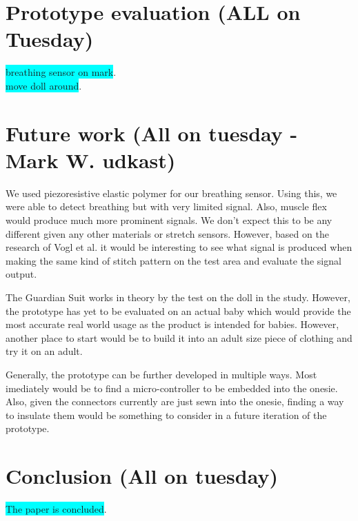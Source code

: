 \documentclass{sigchi-ext}
\begin{document}
\section{Prototype evaluation (ALL on Tuesday)}
\colorbox{cyan}{breathing sensor on mark}.\\
\colorbox{cyan}{move doll around}.

\section{Future work (All on tuesday - Mark W. udkast)}
We used piezoresistive elastic polymer for our breathing sensor. Using this,
we were able to detect breathing but with very limited signal. Also, muscle flex
would produce much more prominent signals. We don't expect this to be any
different given any other materials or stretch sensors. However,
based on the research of Vogl et al. \cite{stretcheband} it would be interesting
to see what signal is produced when making the same kind of stitch pattern on
the test area and evaluate the signal output.

The Guardian Suit works in theory by the test on the doll in the study. However,
the prototype has yet to be evaluated on an actual baby which would provide the
most accurate real world usage as the product is intended for babies. However,
another place to start would be to build it into an adult size piece of clothing
and try it on an adult.

Generally, the prototype can be further developed in multiple ways. Most imediately would be to 
find a micro-controller to be embedded into the onesie. Also, given the connectors currently are just
sewn into the onesie, finding a way to insulate them would be something to consider in a future
iteration of the prototype.

\section{Conclusion (All on tuesday)}
\colorbox{cyan}{The paper is concluded}.




\balance{}



\end{document}
